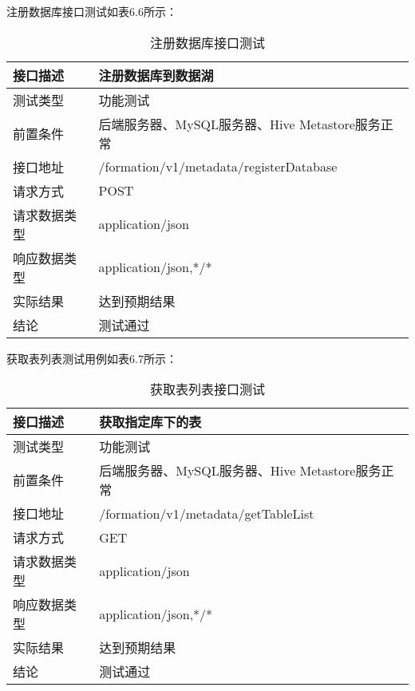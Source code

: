 注册数据库接口测试如表6.6所示：

\begin{table}[h]
  \centering
  \caption{注册数据库接口测试}
  \label{tab:exampletable}
  \begin{tabular}{ll}
    \toprule
    接口描述         & 注册数据库到数据湖         \\
    \midrule
    测试类型         & 功能测试         \\
    前置条件         & 后端服务器、MySQL服务器、Hive Metastore服务正常         \\
    接口地址       & /formation/v1/metadata/registerDatabase        \\
    请求方式         & POST      \\
    请求数据类型         & application/json     \\
    响应数据类型         & application/json,*/*           \\
    实际结果         & 达到预期结果           \\
    结论            & 测试通过           \\
    \bottomrule
  \end{tabular}
\end{table}

获取表列表测试用例如表6.7所示：

\begin{table}[h]
  \centering
  \caption{获取表列表接口测试}
  \label{tab:exampletable}
  \begin{tabular}{ll}
    \toprule
    接口描述         & 获取指定库下的表         \\
    \midrule
    测试类型         & 功能测试         \\
    前置条件         & 后端服务器、MySQL服务器、Hive Metastore服务正常         \\
    接口地址       & /formation/v1/metadata/getTableList        \\
    请求方式         & GET      \\
    请求数据类型         & application/json     \\
    响应数据类型         & application/json,*/*           \\
    实际结果         & 达到预期结果           \\
    结论            & 测试通过           \\
    \bottomrule
  \end{tabular}
\end{table}


